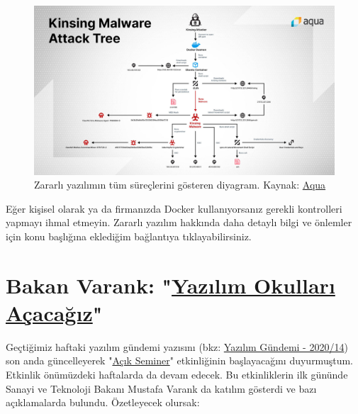 \documentclass[11pt]{article}
\begin{document}
\begin{figure}[htbp]
\centering
\includegraphics[width=.9\linewidth]{gorseller/docker-kinsing.jpg}
\caption{Zararlı yazılımın tüm süreçlerini gösteren diyagram. Kaynak: \href{https://blog.aquasec.com/threat-alert-kinsing-malware-container-vulnerability}{Aqua}}
\end{figure}

Eğer kişisel olarak ya da firmanızda Docker kullanıyorsanız gerekli
kontrolleri yapmayı ihmal etmeyin. Zararlı yazılım hakkında daha detaylı bilgi
ve önlemler için konu başlığına eklediğim bağlantıya tıklayabilirsiniz.
\section{Bakan Varank: "\href{https://www.sanayi.gov.tr/medya/haber-detayi/gLAYI4bI8x59}{Yazılım Okulları Açacağız}"}
\label{sec:orgf6d3f7e}
Geçtiğimiz haftaki yazılım gündemi yazısını (bkz: \href{../14/yazilim-gundemi-2020-14.pdf}{Yazılım Gündemi - 2020/14})
son anda güncelleyerek "\href{https://www.acikseminer.com/}{Açık Seminer}" etkinliğinin başlayacağını duyurmuştum.
Etkinlik önümüzdeki haftalarda da devam edecek. Bu etkinliklerin ilk gününde
Sanayi ve Teknoloji Bakanı Mustafa Varank da katılım gösterdi ve bazı
açıklamalarda bulundu. Özetleyecek olursak:
\end{document}
